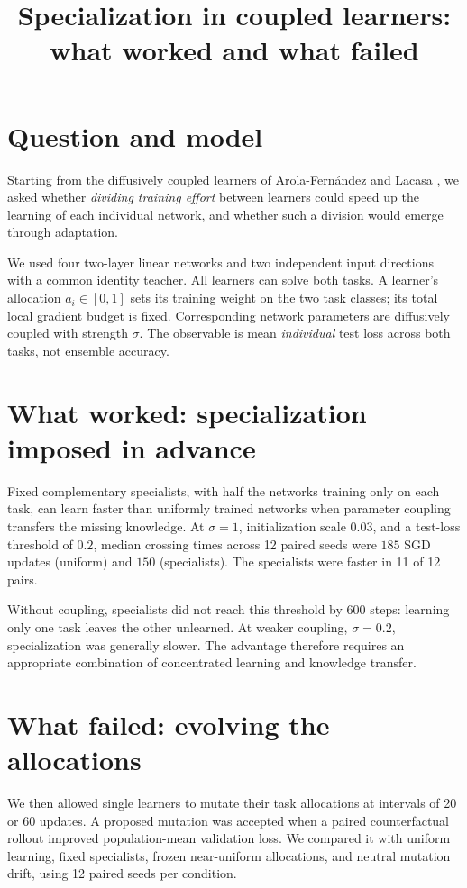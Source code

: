 \documentclass[11pt]{article}
\title{Specialization in coupled learners: what worked and what failed}
\author{}
\date{}
\begin{document}
\maketitle

\section*{Question and model}

Starting from the diffusively coupled learners of
Arola-Fern\'andez and Lacasa \cite{arola2024}, we asked whether
\emph{dividing training effort} between learners could speed up the
learning of each individual network, and whether such a division
would emerge through adaptation.

We used four two-layer linear networks and two independent input
directions with a common identity teacher. All learners can solve
both tasks. A learner's allocation $a_i\in[0,1]$ sets its training
weight on the two task classes; its total local gradient budget
is fixed. Corresponding network parameters are diffusively
coupled with strength $\sigma$. The observable is mean
\emph{individual} test loss across both tasks, not ensemble accuracy.

\section*{What worked: specialization imposed in advance}

Fixed complementary specialists, with half the networks training
only on each task, can learn faster than uniformly trained
networks when parameter coupling transfers the missing knowledge.
At $\sigma=1$, initialization scale $0.03$, and a test-loss
threshold of $0.2$, median crossing times across 12 paired
seeds were $185$ SGD updates (uniform) and $150$ (specialists).
The specialists were faster in 11 of 12 pairs.

Without coupling, specialists did not reach this threshold
by 600 steps: learning only one task leaves the other unlearned.
At weaker coupling, $\sigma=0.2$, specialization was generally
slower. The advantage therefore requires an appropriate
combination of concentrated learning and knowledge transfer.

\section*{What failed: evolving the allocations}

We then allowed single learners to mutate their task allocations
at intervals of 20 or 60 updates. A proposed mutation was accepted
when a paired counterfactual rollout improved population-mean
validation loss. We compared it with uniform learning,
fixed specialists, frozen near-uniform allocations, and
neutral mutation drift, using 12 paired seeds per condition.
\end{document}
